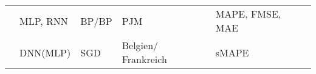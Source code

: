 \begin{table}[H]
\begin{tabularx}{\textwidth}{lZZZZ}
\citet{Mandal2017}      & MLP, RNN   & BP/BP                    & PJM                       & MAPE, FMSE, MAE           \\
\citet{Lago2018}        & DNN(MLP)  & SGD                      & Belgien/ Frankreich        & sMAPE                     \\


\bottomrule
\end{tabularx}
\end{table}